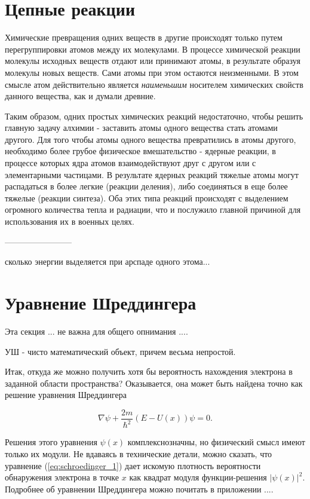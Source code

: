 \section*{Цепные реакции}

Химические превращения одних веществ в другие происходят только путем перегруппировки атомов между их молекулами.
В процессе химической реакции молекулы исходных веществ отдают или принимают атомы, в результате образуя молекулы новых веществ. 
Сами атомы при этом остаются неизменными.
В этом смысле атом действительно является \textit{наименьшим} носителем химических свойств данного вещества, как и думали древние.

Таким образом, одних простых химических реакций недостаточно, чтобы решить главную задачу алхимии - заставить атомы одного вещества стать атомами другого.
Для того чтобы атомы одного вещества превратились в атомы другого, необходимо более грубое физическое вмешательство - ядерные реакции, в процессе которых ядра атомов взаимодействуют друг с другом или с элементарными частицами.
В результате ядерных реакций тяжелые атомы могут распадаться в более легкие (реакции деления), либо соединяться в еще более тяжелые (реакции синтеза).
Оба этих типа реакций происходят с выделением огромного количества тепла и радиации, что и послужило главной причиной для использования их в военных целях.

------------------------

сколько энергии выделяется при арспаде одного этома...


\section*{Уравнение Шреддингера}

Эта секция ... не важна для общего опнимания ....

УШ - чисто математический объект, причем весьма непростой.

Итак, откуда же можно получить хотя бы вероятность нахождения электрона в заданной области пространства?
Оказывается, она может быть найдена точно как решение уравнения Шреддингера

\begin{equation}\label{eq:schroedinger_1}
\nabla\psi + \frac{2m}{\hbar^2}(E - U(x))\psi = 0.
\end{equation}

Решения этого уравнения $\psi(x)$ комплекснозначны, но физический смысл имеют только их модули. 
Не вдаваясь в технические детали, можно сказать, что уравнение (\ref{eq:schroedinger_1}) дает искомую плотность вероятности обнаружения электрона в точке $x$ как квадрат модуля функции-решения $|\psi(x)|^2$.
Подробнее об уравнении Шреддингера можно почитать в приложении ....

